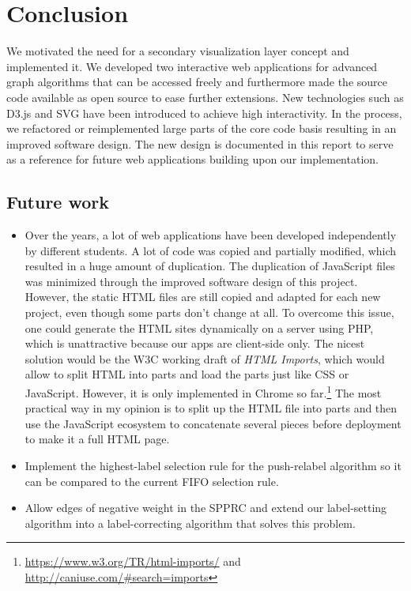 \chapter{Conclusion}\label{ch:6}
We motivated the need for a secondary visualization layer concept and implemented it.
We developed two interactive web applications for advanced graph algorithms that can be accessed freely and furthermore made the source code available as open source to ease further extensions. 
New technologies such as D3.js and SVG have been introduced to achieve high interactivity. In the process, we refactored or reimplemented large parts of the core code basis resulting in an improved software design. The new design is documented in this report to serve as a reference for future web applications building upon our implementation.

\section{Future work}
\begin{itemize}
	\item Over the years, a lot of web applications have been developed independently by different students. A lot of code was copied and partially modified, which resulted in a huge amount of duplication. The duplication of JavaScript files was minimized through the improved software design of this project. However, the static HTML files are still copied and adapted for each new project, even though some parts don't change at all. To overcome this issue, one could generate the HTML sites dynamically on a server using PHP, which is unattractive because our apps are client-side only. The nicest solution would be the W3C working draft of \textit{HTML Imports}, which would allow to split HTML into parts and load the parts just like CSS or JavaScript. However, it is only implemented in Chrome so far.\footnote{\url{https://www.w3.org/TR/html-imports/} and \url{http://caniuse.com/\#search=imports}} The most practical way in my opinion is to split up the HTML file into parts and then use the JavaScript ecosystem to concatenate several pieces before deployment to make it a full HTML page.
	\item Implement the highest-label selection rule for the push-relabel algorithm so it can be compared to the current FIFO selection rule.
	\item Allow edges of negative weight in the SPPRC and extend our label-setting algorithm into a label-correcting algorithm that solves this problem.
\end{itemize}